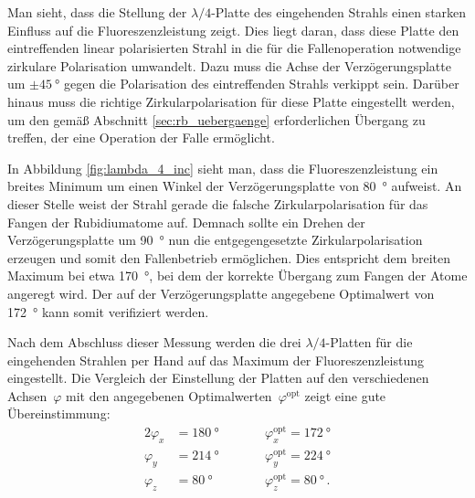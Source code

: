 \documentclass[11pt, a4paper]{article}
\numberwithin{equation}{section}
\begin{document}
Man sieht, dass die Stellung der $\lambda / 4$-Platte des eingehenden Strahls einen starken Einfluss auf die Fluoreszenzleistung zeigt.
Dies liegt daran, dass diese Platte den eintreffenden linear polarisierten Strahl in die für die Fallenoperation notwendige zirkulare Polarisation umwandelt.
Dazu muss die Achse der Verzögerungsplatte um $\pm\SI{45}{\degree}$ gegen die Polarisation des eintreffenden Strahls verkippt sein.
Darüber hinaus muss die richtige Zirkularpolarisation für diese Platte eingestellt werden, um den gemäß Abschnitt \ref{sec:rb_uebergaenge} erforderlichen Übergang zu treffen, der eine Operation der Falle ermöglicht.

In Abbildung \ref{fig:lambda_4_inc} sieht man, dass die Fluoreszenzleistung ein breites Minimum um einen Winkel der Verzögerungsplatte von \SI{80}{\degree} aufweist.
An dieser Stelle weist der Strahl gerade die falsche Zirkularpolarisation für das Fangen der Rubidiumatome auf.
Demnach sollte ein Drehen der Verzögerungsplatte um \SI{90}{\degree} nun die entgegengesetzte Zirkularpolarisation erzeugen und somit den Fallenbetrieb ermöglichen.
Dies entspricht dem breiten Maximum bei etwa \SI{170}{\degree}, bei dem der korrekte Übergang zum Fangen der Atome angeregt wird.
Der auf der Verzögerungsplatte angegebene Optimalwert von \SI{172}{\degree} kann somit verifiziert werden.

Nach dem Abschluss dieser Messung werden die drei $\lambda / 4$-Platten für die eingehenden Strahlen per Hand auf das Maximum der Fluoreszenzleistung eingestellt.
Die Vergleich der Einstellung der Platten auf den verschiedenen Achsen~$\varphi$ mit den angegebenen Optimalwerten~$\varphi^\mathrm{opt}$ zeigt eine gute Übereinstimmung:
\begin{alignat*}{2}
\varphi_x &= \SI{180}{\degree} \qquad &&\varphi_x^\mathrm{opt} = \SI{172}{\degree}\\
\varphi_y &= \SI{214}{\degree} \qquad &&\varphi_y^\mathrm{opt} = \SI{224}{\degree}\\
\varphi_z &= \SI{80}{\degree} \qquad &&\varphi_z^\mathrm{opt} = \SI{80}{\degree} \, \text{.}
\end{alignat*}
\end{document}
